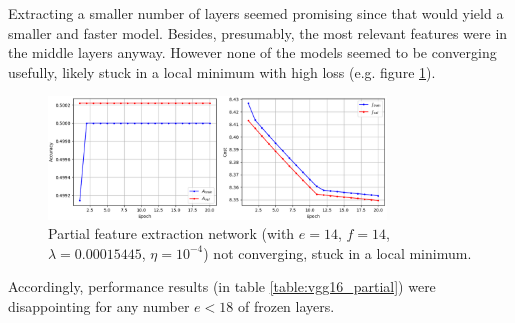 Extracting a smaller number of layers seemed promising since that would yield a smaller and faster model. Besides, presumably, the most relevant features were in the middle layers anyway. However none of the models seemed to be converging usefully, likely stuck in a local minimum with high loss (e.g. figure \ref{fig:vgg16_partial_divergence}).

\begin{figure}[ht]
    \centering
    \includegraphics[width=0.8\textwidth]{figs/vgg16_partial_divergence.png}
    \caption{Partial feature extraction network (with $e = 14$, $f = 14$, $\lambda = 0.00015445$, $\eta = 10^{-4}$) not converging, stuck in a local minimum.}
    \label{fig:vgg16_partial_divergence}
\end{figure}

Accordingly, performance results (in table \ref{table:vgg16_partial}) were disappointing for any number $e < 18$ of frozen layers.

